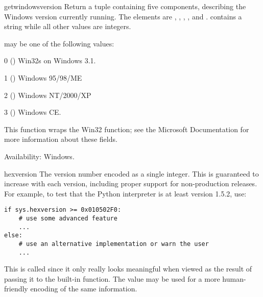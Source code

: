 \begin{funcdesc}{getwindowsversion}{}
  Return a tuple containing five components, describing the Windows 
  version currently running.  The elements are , , 
  , , and .   contains
  a string while all other values are integers.

   may be one of the following values:
  \begin{list}{}{\leftmargin 0.7in }
    \item[0 (\constant{VER_PLATFORM_WIN32s})]
      Win32s on Windows 3.1.
    \item[1 (\constant{VER_PLATFORM_WIN32_WINDOWS})] 
      Windows 95/98/ME
    \item[2 (\constant{VER_PLATFORM_WIN32_NT})] 
      Windows NT/2000/XP
    \item[3 (\constant{VER_PLATFORM_WIN32_CE})] 
      Windows CE.
  \end{list}
  
  This function wraps the Win32  function;
  see the Microsoft Documentation for more information about these
  fields.

  Availability: Windows.
\end{funcdesc}

\begin{datadesc}{hexversion}
  The version number encoded as a single integer.  This is guaranteed
  to increase with each version, including proper support for
  non-production releases.  For example, to test that the Python
  interpreter is at least version 1.5.2, use:

\begin{verbatim}
if sys.hexversion >= 0x010502F0:
    # use some advanced feature
    ...
else:
    # use an alternative implementation or warn the user
    ...
\end{verbatim}

  This is called  since it only really looks
  meaningful when viewed as the result of passing it to the built-in
   function.  The  value may be
  used for a more human-friendly encoding of the same information.
\end{datadesc}

